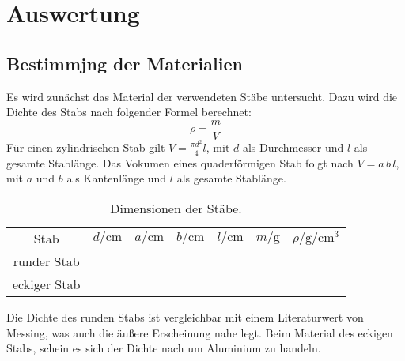 \section{Auswertung}
\label{sec:Auswertung}
%
\subsection{Bestimmjng der Materialien}
Es wird zunächst das Material der verwendeten Stäbe untersucht. Dazu wird die Dichte des Stabs nach 
folgender Formel berechnet:
\begin{equation}
    \rho = \frac{m}{V}
\end{equation}
Für einen zylindrischen Stab gilt $V=\frac{\pi d^2}{4}l$, mit $d$ als Durchmesser und $l$ als gesamte Stablänge.
Das Vokumen eines quaderförmigen Stab folgt nach $V=a\, b\, l$, mit $a$ und $b$ als Kantenlänge und $l$ 
als gesamte Stablänge.
%
\begin{table}
    \centering
    \caption{Dimensionen der Stäbe.}
    \label{tab:dim}
    \begin{tabular}{cSSSSSS}
        \toprule
        {Stab} & 
        {$d/\si{\centi\meter}$} & 
        {$a/\si{\centi\meter}$} & 
        {$b/\si{\centi\meter}$} & 
        {$l/\si{\centi\meter}$} &
        {$m/\si{\gram}$} &
        {$\rho/\si{\gram\per\centi\meter\cubed}$} \\
        {runder Stab}     & \\ 
        {eckiger Stab}  & \\
    \end{tabular}
\end{table}
\noindent
Die Dichte des runden Stabs ist vergleichbar mit einem Literaturwert von Messing, was auch die äußere 
Erscheinung nahe legt. Beim Material des eckigen Stabs, schein es sich der Dichte nach um Aluminium zu 
handeln. 
%

